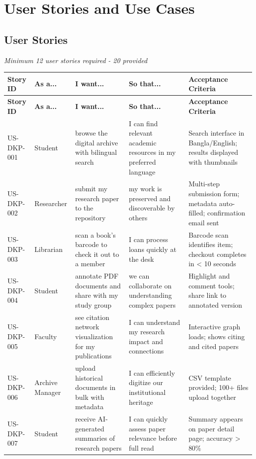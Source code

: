 \documentclass[12pt,a4paper]{report}
\begin{document}
\chapter{User Stories and Use Cases}

\section{User Stories}

\textit{Minimum 12 user stories required - 20 provided}

\begin{longtable}{|p{2cm}|p{2cm}|p{3cm}|p{3cm}|p{4cm}|}
\hline
\textbf{Story ID} & \textbf{As a...} & \textbf{I want...} & \textbf{So that...} & \textbf{Acceptance Criteria} \\ \hline
\endfirsthead
\hline
\textbf{Story ID} & \textbf{As a...} & \textbf{I want...} & \textbf{So that...} & \textbf{Acceptance Criteria} \\ \hline
\endhead
US-DKP-001 & Student & browse the digital archive with bilingual search & I can find relevant academic resources in my preferred language & Search interface in Bangla/English; results displayed with thumbnails \\ \hline
US-DKP-002 & Researcher & submit my research paper to the repository & my work is preserved and discoverable by others & Multi-step submission form; metadata auto-filled; confirmation email sent \\ \hline
US-DKP-003 & Librarian & scan a book's barcode to check it out to a member & I can process loans quickly at the desk & Barcode scan identifies item; checkout completes in < 10 seconds \\ \hline
US-DKP-004 & Student & annotate PDF documents and share with my study group & we can collaborate on understanding complex papers & Highlight and comment tools; share link to annotated version \\ \hline
US-DKP-005 & Faculty & see citation network visualization for my publications & I can understand my research impact and connections & Interactive graph loads; shows citing and cited papers \\ \hline
US-DKP-006 & Archive Manager & upload historical documents in bulk with metadata & I can efficiently digitize our institutional heritage & CSV template provided; 100+ files upload together \\ \hline
US-DKP-007 & Student & receive AI-generated summaries of research papers & I can quickly assess paper relevance before full read & Summary appears on paper detail page; accuracy > 80\% \\ \hline

\end{longtable}
\end{document}
